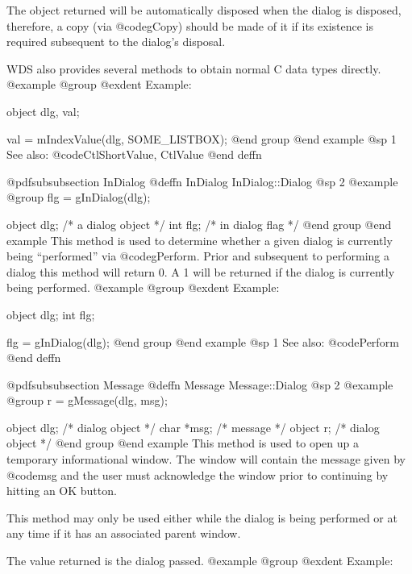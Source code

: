 The object returned will be automatically disposed when the dialog is
disposed, therefore, a copy (via @code{gCopy}) should be made of it if
its existence is required subsequent to the dialog's disposal.

WDS also provides several methods to obtain normal C data types directly.
@example
@group
@exdent Example:

object  dlg, val;

val = mIndexValue(dlg, SOME_LISTBOX);
@end group
@end example
@sp 1
See also:  @code{CtlShortValue, CtlValue}
@end deffn








@pdfsubsubsection {InDialog}
@deffn {InDialog} InDialog::Dialog
@sp 2
@example
@group
flg = gInDialog(dlg);

object  dlg;    /*  a dialog object  */
int     flg;    /*  in dialog flag   */
@end group
@end example
This method is used to determine whether a given dialog is currently
being ``performed'' via @code{gPerform}.  Prior and subsequent to
performing a dialog this method will return 0.  A 1 will be returned
if the dialog is currently being performed.
@example
@group
@exdent Example:

object  dlg;
int     flg;

flg = gInDialog(dlg);
@end group
@end example
@sp 1
See also:  @code{Perform}
@end deffn















@pdfsubsubsection {Message}
@deffn {Message} Message::Dialog
@sp 2
@example
@group
r = gMessage(dlg, msg);

object  dlg;    /*  dialog object  */
char    *msg;   /*  message        */
object  r;      /*  dialog object  */
@end group
@end example
This method is used to open up a temporary informational window.  The
window will contain the message given by @code{msg} and the user must
acknowledge the window prior to continuing by hitting an OK button.

This method may only be used either while the dialog is being performed
or at any time if it has an associated parent window.

The value returned is the dialog passed.
@example
@group
@exdent Example:

